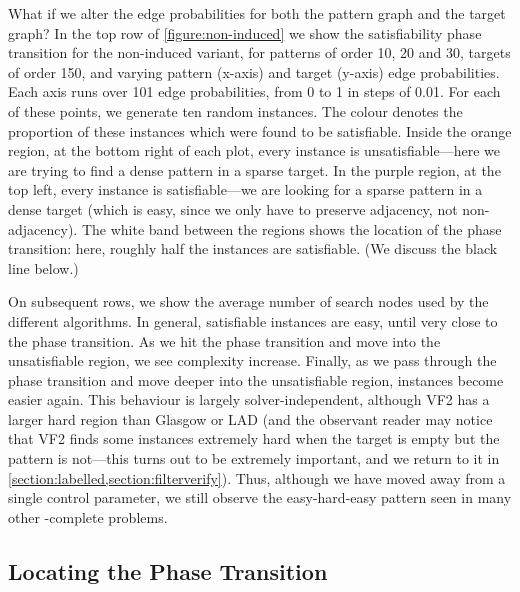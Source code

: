\documentclass[twoside,11pt]{article}
\begin{document}
What if we alter the edge probabilities for both the pattern graph and the target graph?  In the top
row of \cref{figure:non-induced} we show the satisfiability phase transition for the non-induced
variant, for patterns of order 10, 20 and 30, targets of order 150, and varying pattern (x-axis) and
target (y-axis) edge probabilities. Each axis runs over 101 edge probabilities, from 0 to 1 in steps
of 0.01. For each of these points, we generate ten random instances. The colour denotes the
proportion of these instances which were found to be satisfiable.  Inside the orange region, at the
bottom right of each plot, every instance is unsatisfiable---here we are trying to find a dense
pattern in a sparse target. In the purple region, at the top left, every instance is
satisfiable---we are looking for a sparse pattern in a dense target (which is easy, since we only
have to preserve adjacency, not non-adjacency). The white band between the regions shows the
location of the phase transition: here, roughly half the instances are satisfiable. (We discuss the
black line below.)

On subsequent rows, we show the average number of search nodes used by the different algorithms. In
general, satisfiable instances are easy, until very close to the phase transition. As we hit the
phase transition and move into the unsatisfiable region, we see complexity increase. Finally, as
we pass through the phase transition and move deeper into the unsatisfiable region, instances become
easier again. This behaviour is largely solver-independent, although VF2 has a larger hard region
than Glasgow or LAD (and the observant reader may notice that VF2 finds some instances extremely
hard when the target is empty but the pattern is not---this turns out to be extremely important, and
we return to it in \cref{section:labelled,section:filterverify}). Thus, although we have moved away
from a single control parameter, we still observe the easy-hard-easy pattern seen in many other
\NP-complete problems.

\subsection{Locating the Phase Transition}
\end{document}
